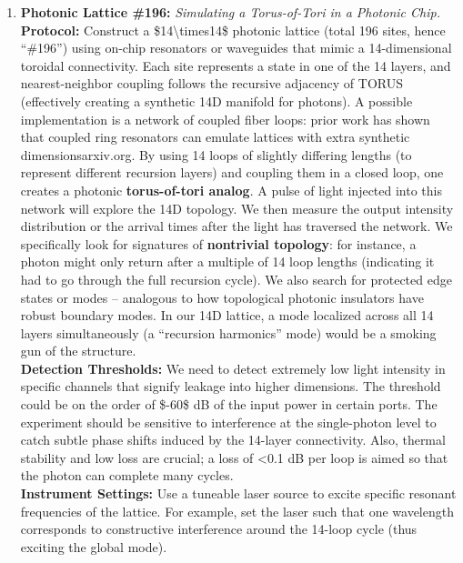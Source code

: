 \documentclass[]{article}
\begin{document}
\begin{enumerate}
\def\labelenumi{\arabic{enumi}.}
\item
  \textbf{Photonic Lattice \#196:} \emph{Simulating a Torus-of-Tori in a
  Photonic Chip.}\\
  \textbf{Protocol:} Construct a \$14\textbackslash{}times14\$ photonic
  lattice (total 196 sites, hence ``\#196'') using on-chip resonators or
  waveguides that mimic a 14-dimensional toroidal connectivity. Each
  site represents a state in one of the 14 layers, and nearest-neighbor
  coupling follows the recursive adjacency of TORUS (effectively
  creating a synthetic 14D manifold for photons). A possible
  implementation is a network of coupled fiber loops: prior work has
  shown that coupled ring resonators can emulate lattices with extra
  synthetic dimensions​arxiv.org. By using 14 loops of slightly
  differing lengths (to represent different recursion layers) and
  coupling them in a closed loop, one creates a photonic
  \textbf{torus-of-tori analog}. A pulse of light injected into this
  network will explore the 14D topology. We then measure the output
  intensity distribution or the arrival times after the light has
  traversed the network. We specifically look for signatures of
  \textbf{nontrivial topology}: for instance, a photon might only return
  after a multiple of 14 loop lengths (indicating it had to go through
  the full recursion cycle). We also search for protected edge states or
  modes -- analogous to how topological photonic insulators have robust
  boundary modes​. In our 14D lattice, a mode localized across all 14
  layers simultaneously (a ``recursion harmonics'' mode) would be a
  smoking gun of the structure.\\
  \textbf{Detection Thresholds:} We need to detect extremely low light
  intensity in specific channels that signify leakage into higher
  dimensions. The threshold could be on the order of \$-60\$ dB of the
  input power in certain ports. The experiment should be sensitive to
  interference at the single-photon level to catch subtle phase shifts
  induced by the 14-layer connectivity. Also, thermal stability and low
  loss are crucial; a loss of \textless{}0.1 dB per loop is aimed so
  that the photon can complete many cycles.\\
  \textbf{Instrument Settings:} Use a tuneable laser source to excite
  specific resonant frequencies of the lattice. For example, set the
  laser such that one wavelength corresponds to constructive
  interference around the 14-loop cycle (thus exciting the global mode).

\end{enumerate}
\end{document}
